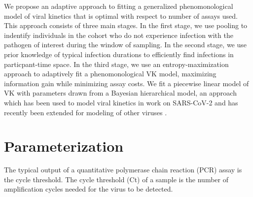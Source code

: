 \documentclass[11pt,notitlepage]{article}
\begin{document}

We propose an adaptive approach to fitting a generalized phenomonological model of viral kinetics that is optimal with respect to number of assays used.
This approach consists of three main stages.
In the first stage, we use pooling to indentify individuals in the cohort who do not experience infection with the pathogen of interest during the window of sampling.
In the second stage, we use prior knowledge of typical infection durations to efficiently find infections in particpant-time space.
In the third stage, we use an entropy-maximization approach to adaptively fit a phenomonological VK model, maximizing information gain while minimizing assay costs.
We fit a piecewise linear model of VK with parameters drawn from a Bayesian hierarchical model, an approach which has been used to model viral kinetics in work on SARS-CoV-2 \cite{kissler2023viral} and has recently been extended for modeling of other viruses \cite{eales2026modeling, sauter2026roles}.

\section{Parameterization}
The typical output of a quantitative polymerase chain reaction (PCR) assay is the cycle threshold.
The cycle threshold (Ct) of a sample is the number of amplification cycles needed for the virus to be detected.
\end{document}
